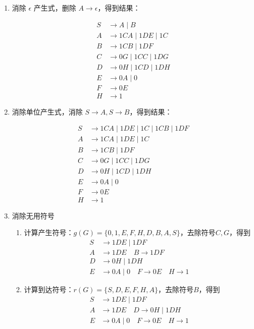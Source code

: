 \documentclass{article}
\begin{document}
	\begin{enumerate}[noitemsep, label={{\arabic*})}]
		\item 消除 $\epsilon$ 产生式，删除 $ A \to \epsilon $，得到结果：
		
		\begin{align*}
			S &\rightarrow A \mid B \\
			A &\rightarrow 1CA \mid 1DE \mid 1C \\
			B &\rightarrow 1CB \mid 1DF \\
			C &\rightarrow 0G \mid 1CC \mid 1DG \\
			D &\rightarrow 0H \mid 1CD \mid 1DH \\
			E &\rightarrow 0A \mid 0 \\
			F &\rightarrow 0E \\
			H &\rightarrow 1
		\end{align*}
		
		\item 消除单位产生式，消除 $ S \to A, S \to B$，得到结果：
		
		\begin{align*}
			S &\rightarrow 1CA \mid 1DE \mid 1C \mid 1CB \mid 1DF \\
			A &\rightarrow 1CA \mid 1DE \mid 1C \\
			B &\rightarrow 1CB \mid 1DF \\
			C &\rightarrow 0G \mid 1CC \mid 1DG \\
			D &\rightarrow 0H \mid 1CD \mid 1DH \\
			E &\rightarrow 0A \mid 0 \\
			F &\rightarrow 0E \\
			H &\rightarrow 1
		\end{align*}
		
		\item 消除无用符号
		
		\begin{enumerate}
			\item 计算产生符号：$g(G) = \{0, 1, E, F, H, D, B, A, S\}$，去除符号$C, G$，得到
			\begin{align*}
				S &\rightarrow 1DE \mid 1DF \\
				A &\rightarrow 1DE \quad B \rightarrow 1DF \\
				D &\rightarrow 0H \mid 1DH \\
				E &\rightarrow 0A \mid 0 \quad F \rightarrow 0E \quad H \rightarrow 1
			\end{align*}
			
			\item 计算到达符号：$r(G) = \{S, D, E, F, H, A\}$，去除符号$B$，得到
			\begin{align*}
				S &\rightarrow 1DE \mid 1DF \\
				A &\rightarrow 1DE \quad D \rightarrow 0H \mid 1DH \\
				E &\rightarrow 0A \mid 0 \quad F \rightarrow 0E \quad H \rightarrow 1
			\end{align*}
		\end{enumerate}
		
	\end{enumerate}\textbf{}
	
\end{document}
